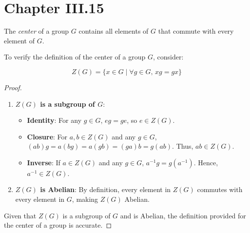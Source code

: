 \documentclass[12pt]{amsart}
\theoremstyle{definition}
\numberwithin{equation}{section}
\theoremstyle{plain}
\begin{document}
\section*{Chapter III.15}
\begin{exercise}{17} The \textit{center} of a group $G$ contains all elements of $G$ that commute with every element of $G$.
    

    To verify the definition of the center of a group \( G \), consider:
    
    \[ Z(G) = \{ x \in G \mid \forall g \in G, \, xg = gx \} \]
    
    \begin{proof} $ $ \\
    \begin{enumerate}
        \item \textbf{\( Z(G) \) is a subgroup of \( G \)}:
           
           \begin{itemize}
            \item \textbf{Identity}: For any \( g \in G \), \( eg = ge \), so \( e \in Z(G) \).
            \item \textbf{Closure}: For \( a, b \in Z(G) \) and any \( g \in G \), \( (ab)g = a(bg) = a(gb) = (ga)b = g(ab) \). Thus, \( ab \in Z(G) \).
            \item \textbf{Inverse}: If \( a \in Z(G) \) and any \( g \in G \), \( a^{-1}g = g(a^{-1}) \). Hence, \( a^{-1} \in Z(G) \).
           \end{itemize}
        
        \item \textbf{\( Z(G) \) is Abelian}: By definition, every element in \( Z(G) \) commutes with every element in \( G \), making \( Z(G) \) Abelian.
    \end{enumerate}
        
        Given that \( Z(G) \) is a subgroup of \( G \) and is Abelian, the definition provided for the center of a group is accurate.
    \end{proof}
    
\end{exercise}
\vspace*{20pt}
\end{document}
